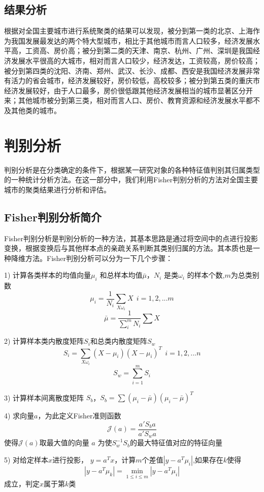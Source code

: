 \documentclass [a4paper]{article}
\begin{document}
\subsection{结果分析}

根据对全国主要城市进行系统聚类的结果可以发现，被分到第一类的北京、上海作为我国发展最发达的两个特大型城市，相比于其他城市而言人口较多，经济发展水平高，工资高、房价高；被分到第二类的天津、南京、杭州、广州、深圳是我国经济发展水平很高的大城市，相对而言人口较少，经济发达，工资较高，房价较高；被分到第四类的沈阳、济南、郑州、武汉、长沙、成都、西安是我国经济发展非常有活力的省会城市，经济发展较好，房价较低，高校较多；被分到第五类的重庆市经济发展较好，由于人口最多，房价很低跟其他经济发展相当的城市显著区分开来；其他城市被分到第三类，相对而言人口、房价、教育资源和经济发展水平都不及其他类的城市。

\section{判别分析}
判别分析是在分类确定的条件下，根据某一研究对象的各种特征值判别其归属类型的一种统计分析方法。在这一部分中，我们利用Fisher判别分析的方法对全国主要城市的聚类结果进行分析和评估。
\subsection{Fisher判别分析简介}
Fisher判别分析是判别分析的一种方法，其基本思路是通过将空间中的点进行投影变换，根据变换后与其他样本点的亲疏关系判断其类别归属的方法。其本质也是一种降维方法。Fisher判别分析可以分为一下几个步骤：

1) 计算各类样本的均值向量$\mu_i$ 和总样本均值$\bar{\mu}$，$N_i$ 是类$\omega_i$ 的样本个数,$m$为总类别数
$$ \mu_i = \frac{1}{N_i}\sum_{X \omega_i}X ~~ i=1,2,...m$$
$$ \bar{\mu} = \frac{1}{\sum_i^m{N_i}} \sum X$$

2) 计算样本类内散度矩阵$S_i$和总类内散度矩阵$S_w$
$$ S_i = \sum_{X \omega_i} (X-\mu_i)(X-\mu_i)^T ~~ i = 1,2,...n$$
$$ S_w = \sum_{i=1}^m S_i$$

3) 计算样本间离散度矩阵 $S_b$，$S_b = \sum(\mu_i-\bar{\mu})(\mu_i - \bar{\mu})^T$

4) 求向量$a$，为此定义Fisher准则函数
  $$\mathcal{J} (a)= \frac{a'S_ba}{a'S_wa}$$
  使得$\mathcal{J}(a)$取最大值的向量 $a$ 为使$S_w^{-1}S_b$的最大特征值对应的特征向量

5) 对给定样本$x$进行投影， $y = a^Tx$，计算$m$个差值$|y - a^T\mu_i|$,如果存在$k$使得
  $$|y - a^T\mu_k| = \min_{1\le i \le m} |y - a^T \mu_i|$$
  成立，判定$x$属于第$k$类
\end{document}
